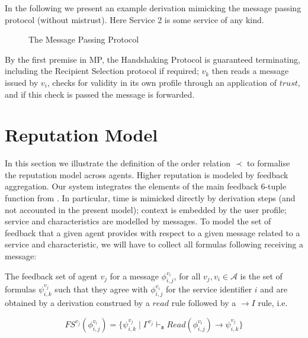 \documentclass[]{llncs}
\begin{document}
In the following we present an example derivation mimicking the message passing protocol (without mistrust). Here Service 2 is some service of any kind.


\begin{figure*}
	\begin{prooftree}
		\end{prooftree}

	\caption{The Message Passing Protocol}\label{fig:mp}
\end{figure*}


By the first premise in MP, the Handshaking Protocol is guaranteed terminating, including the Recipient Selection protocol if required; $v_{k}$ then reads a message issued by $v_{i}$, checks for validity in its own profile through an application of $trust$, and if this check is passed the message is forwarded.


\section{Reputation Model}

In this section we illustrate the definition of the order relation $\prec$ to formalise the reputation model across agents. Higher reputation is modeled by feedback aggregation. Our system integrates the elements of the main feedback 6-tuple function from \cite{xxx}. In particular, time is mimicked directly by derivation steps (and not accounted in the present model); context is embedded by the user profile; service and characteristics are modelled by messages. To model the set of feedback that a given agent provides with respect to a given message related to a service and characteristic, we will have to collect all formulas following receiving a message:

\begin{definition}
The feedback set of agent $v_{j}$ for a message $\phi^{v_{i}}_{i,j}$, for all $v_{j}, v_{i} \in \mathcal{A}$ is the set of formulas $\psi^{v_{j}}_{i,k}$ such that they agree with $\phi^{v_{i}}_{i,j}$ for the service identifier $i$ and are obtained by a derivation construed by a $read$ rule followed by a $\rightarrow I$ rule, i.e.

\[
FS^{v_{j}}(\phi^{v_{i}}_{i,j})=\{ \psi^{v_{j}}_{i,k}\mid \Gamma^{v_{j}}
\vdash_{\mathtt{s}}  Read(\phi^{v_{i}}_{i,j})\rightarrow \psi^{v_{j}}_{i,k}  \}
\]

\end{definition}
\end{document}
